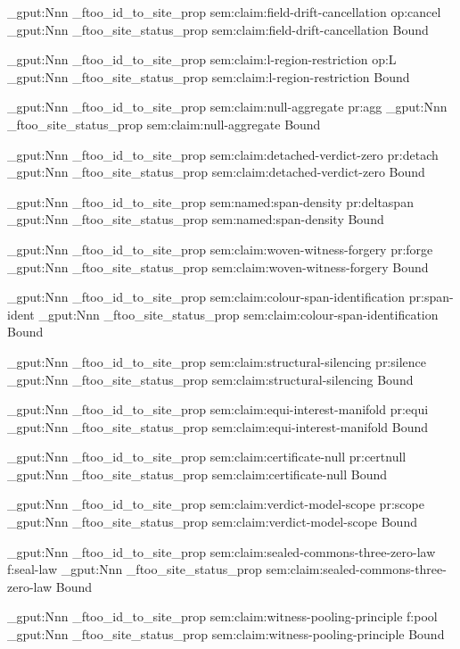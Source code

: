\prop_gput:Nnn \g_ftoo_id_to_site_prop { sem:claim:field-drift-cancellation } { op:cancel }
\prop_gput:Nnn \g_ftoo_site_status_prop { sem:claim:field-drift-cancellation } { Bound }

\prop_gput:Nnn \g_ftoo_id_to_site_prop { sem:claim:l-region-restriction } { op:L }
\prop_gput:Nnn \g_ftoo_site_status_prop { sem:claim:l-region-restriction } { Bound }

\prop_gput:Nnn \g_ftoo_id_to_site_prop { sem:claim:null-aggregate } { pr:agg }
\prop_gput:Nnn \g_ftoo_site_status_prop { sem:claim:null-aggregate } { Bound }

\prop_gput:Nnn \g_ftoo_id_to_site_prop { sem:claim:detached-verdict-zero } { pr:detach }
\prop_gput:Nnn \g_ftoo_site_status_prop { sem:claim:detached-verdict-zero } { Bound }

\prop_gput:Nnn \g_ftoo_id_to_site_prop { sem:named:span-density } { pr:deltaspan }
\prop_gput:Nnn \g_ftoo_site_status_prop { sem:named:span-density } { Bound }

\prop_gput:Nnn \g_ftoo_id_to_site_prop { sem:claim:woven-witness-forgery } { pr:forge }
\prop_gput:Nnn \g_ftoo_site_status_prop { sem:claim:woven-witness-forgery } { Bound }

\prop_gput:Nnn \g_ftoo_id_to_site_prop { sem:claim:colour-span-identification } { pr:span-ident }
\prop_gput:Nnn \g_ftoo_site_status_prop { sem:claim:colour-span-identification } { Bound }

\prop_gput:Nnn \g_ftoo_id_to_site_prop { sem:claim:structural-silencing } { pr:silence }
\prop_gput:Nnn \g_ftoo_site_status_prop { sem:claim:structural-silencing } { Bound }

\prop_gput:Nnn \g_ftoo_id_to_site_prop { sem:claim:equi-interest-manifold } { pr:equi }
\prop_gput:Nnn \g_ftoo_site_status_prop { sem:claim:equi-interest-manifold } { Bound }

\prop_gput:Nnn \g_ftoo_id_to_site_prop { sem:claim:certificate-null } { pr:certnull }
\prop_gput:Nnn \g_ftoo_site_status_prop { sem:claim:certificate-null } { Bound }

\prop_gput:Nnn \g_ftoo_id_to_site_prop { sem:claim:verdict-model-scope } { pr:scope }
\prop_gput:Nnn \g_ftoo_site_status_prop { sem:claim:verdict-model-scope } { Bound }

\prop_gput:Nnn \g_ftoo_id_to_site_prop { sem:claim:sealed-commons-three-zero-law } { f:seal-law }
\prop_gput:Nnn \g_ftoo_site_status_prop { sem:claim:sealed-commons-three-zero-law } { Bound }

\prop_gput:Nnn \g_ftoo_id_to_site_prop { sem:claim:witness-pooling-principle } { f:pool }
\prop_gput:Nnn \g_ftoo_site_status_prop { sem:claim:witness-pooling-principle } { Bound }

